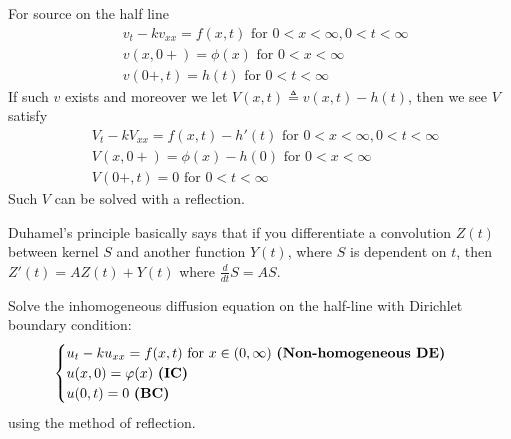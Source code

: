 \documentclass{report}
\begin{document}
\begin{mdframed}
For source on the half line 
\begin{align*}
&v_t-kv_{xx}=f(x,t)\text{ for }0<x<\infty, 0 < t< \infty \\
&v(x,0+)=\phi (x)\text{ for }0<x<\infty \\
&v(0+,t)=h(t)\text{ for }0<t<\infty
\end{align*}
If such $v$ exists and moreover we let $V(x,t)\triangleq v(x,t)-h(t)$, then we see $V$  satisfy 
 \begin{align*}
&V_t-kV_{xx}=f(x,t)-h'(t)\text{ for }0<x<\infty,0<t<\infty \\
&V(x,0+)=\phi (x)- h(0)\text{ for }0<x<\infty \\
&V(0+,t)=0\text{ for }0<t<\infty
\end{align*}
Such $V$ can be solved with a reflection.
\end{mdframed}
\begin{mdframed}
Duhamel's principle basically says that if you differentiate a convolution $Z(t)$ between kernel $S$ and another function $Y(t)$, where $S$ is dependent on  $t$, then $Z'(t)=AZ(t)+Y(t)$ where $\frac{d}{dt}S=AS$. 
\end{mdframed}
\begin{question}{}{}
Solve the inhomogeneous diffusion equation on the half-line with Dirichlet boundary condition: 
\begin{align*}
\begin{cases} 
  u_t-ku_{xx}=f(x,t)\text{ for }x\in (0,\infty)\text{ \textbf{(Non-homogeneous DE)} }\\
  u(x,0)= \phi (x)\text{ \textbf{(IC)} }\\
  u(0,t)=0\text{ \textbf{(BC)} }
\end{cases}
\end{align*}
using the method of reflection. 
\end{question}
\end{document}
